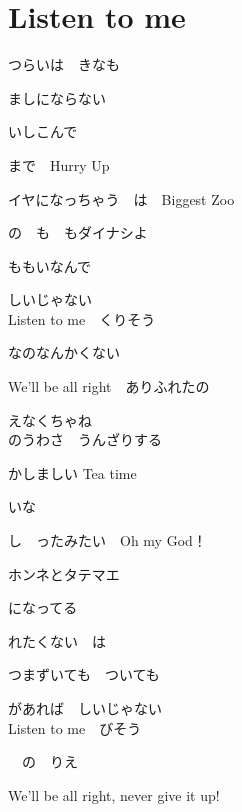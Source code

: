 \section{ Listen to me}
\large{

つらいは　きなも

ましにならない

いしこんで

まで　Hurry Up

イヤになっちゃう　は　Biggest Zoo

の　も　もダイナシよ

ももいなんで

しいじゃない
\\

Listen to me　くりそう

なのなんかくない

We'll be all right　ありふれたの

えなくちゃね
\\

のうわさ　うんざりする

かしましい Tea time

いな　

し　ったみたい　Oh my God！

ホンネとタテマエ

になってる

れたくない　は

つまずいても　ついても

があれば　しいじゃない
\\

Listen to me　びそう

　の　りえ

We'll be all right, never give it up!

}
